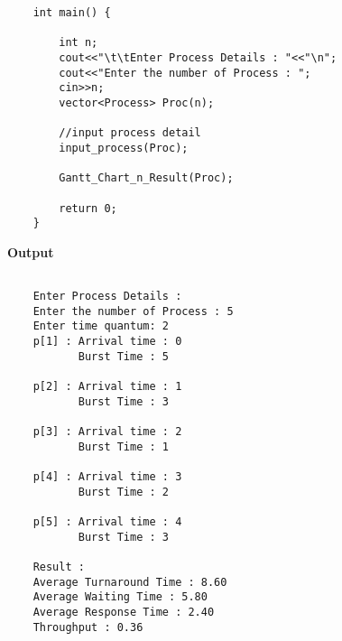 \documentclass{article}
\begin{document}
\begin{enumerate}
{\begin{verbatim}
    int main() {
    
        int n;
        cout<<"\t\tEnter Process Details : "<<"\n";
        cout<<"Enter the number of Process : ";
        cin>>n;
        vector<Process> Proc(n);
    
        //input process detail
        input_process(Proc);
    
        Gantt_Chart_n_Result(Proc);
    
        return 0;
    }

\end{verbatim}
\textbf{Output}
\begin{verbatim}
    
    Enter Process Details :
    Enter the number of Process : 5
    Enter time quantum: 2
    p[1] : Arrival time : 0
           Burst Time : 5
    
    p[2] : Arrival time : 1
           Burst Time : 3
    
    p[3] : Arrival time : 2
           Burst Time : 1
    
    p[4] : Arrival time : 3
           Burst Time : 2
    
    p[5] : Arrival time : 4
           Burst Time : 3
    
    Result :
    Average Turnaround Time : 8.60
    Average Waiting Time : 5.80
    Average Response Time : 2.40
    Throughput : 0.36

\end{verbatim}
}

\end{enumerate}
\end{document}
